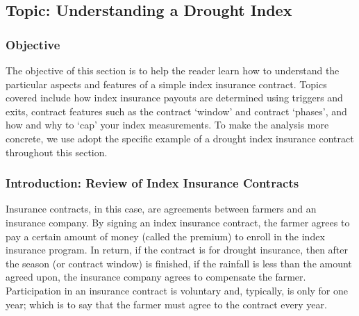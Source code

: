\documentclass[letterpaper,10pt,english]{sphinxmanual}
\begin{document}
\subsection{Topic: Understanding a Drought Index}
\label{whatisindexinsurance/understandingadroughtindex_en_Web:topic-understanding-a-drought-index}

\subsubsection{Objective}
\label{whatisindexinsurance/understandingadroughtindex_en_Web:objective}
The objective of this section is to help the reader learn how to understand the particular aspects and features of a simple index insurance contract.  Topics covered include how index insurance payouts are determined using triggers and exits, contract features such as the contract ‘window’ and contract ‘phases’, and how and why to ‘cap’ your index measurements.  To make the analysis more concrete, we use adopt the specific example of a drought index insurance contract throughout this section.


\subsubsection{Introduction: Review of Index Insurance Contracts}
\label{whatisindexinsurance/understandingadroughtindex_en_Web:introduction-review-of-index-insurance-contracts}
Insurance contracts, in this case, are agreements between farmers and an insurance company. By signing an index insurance contract, the farmer agrees to pay a certain amount of money (called the premium) to enroll in the index insurance program. In return, if the contract is for drought insurance, then after the season (or contract window) is finished, if the rainfall is less than the amount agreed upon, the insurance company agrees to compensate the farmer. Participation in an insurance contract is voluntary and, typically, is only for one year; which is to say that the farmer must agree to the contract every year.
\end{document}
